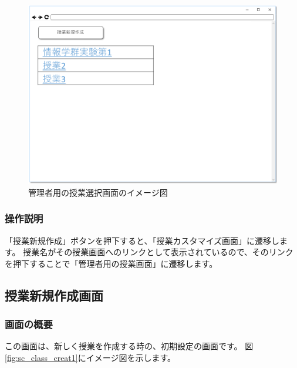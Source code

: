 \begin{figure}[htbp]
  \begin{center}
    \includegraphics[width=1\linewidth,clip]{./img/sc_select_class.png}
    \caption{管理者用の授業選択画面のイメージ図}\label{fig:sc_select_class}
  \end{center}
\end{figure}

\subsubsection{操作説明}
「授業新規作成」ボタンを押下すると、「授業カスタマイズ画面」に遷移します。
授業名がその授業画面へのリンクとして表示されているので、そのリンクを押下することで「管理者用の授業画面」に遷移します。

\newpage

\subsection{授業新規作成画面}
\subsubsection{画面の概要}
この画面は、新しく授業を作成する時の、初期設定の画面です。
図\ref{fig:sc_class_creat1}にイメージ図を示します。

